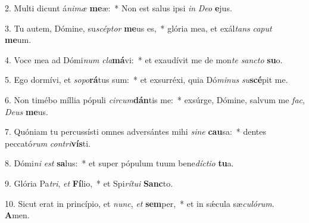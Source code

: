 2. Multi dicunt á\textit{ni}\textit{mæ} \textbf{me}æ:~*  Non est salus ipsi \textit{in} \textit{De}\textit{o} \textbf{e}jus.\

3. Tu autem, Dómine, su\textit{scép}\textit{tor} \textbf{me}us es,~*  glória mea, et exál\textit{tans} \textit{ca}\textit{put} \textbf{me}um.\

4. Voce mea ad Dómi\textit{num} \textit{cla}\textbf{má}vi:~*  et exaudívit me de mon\textit{te} \textit{sanc}\textit{to} \textbf{su}o.\

5. Ego dormívi, et \textit{so}\textit{po}\textbf{rá}tus sum:~*  et exsurréxi, quia Dó\textit{mi}\textit{nus} \textit{su}\textbf{scé}pit me.\

6. Non timébo míllia pópuli \textit{cir}\textit{cum}\textbf{dán}tis me:~*  exsúrge, Dómine, salvum me \textit{fac}, \textit{De}\textit{us} \textbf{me}us.\

7. Quóniam tu percussísti omnes adversántes mihi \textit{si}\textit{ne} \textbf{cau}sa:~*  dentes peccató\textit{rum} \textit{con}\textit{tri}\textbf{vís}ti.\

8. Dómi\textit{ni} \textit{est} \textbf{sa}lus:~*  et super pópulum tuum bene\textit{díc}\textit{ti}\textit{o} \textbf{tu}a.\

9. Glória Pa\textit{tri}, \textit{et} \textbf{Fí}lio,~*  et Spi\textit{rí}\textit{tu}\textit{i} \textbf{Sanc}to.\

10. Sicut erat in princípio, et \textit{nunc}, \textit{et} \textbf{sem}per,~*  et in sǽcula sæ\textit{cu}\textit{ló}\textit{rum}. \textbf{A}men.\

